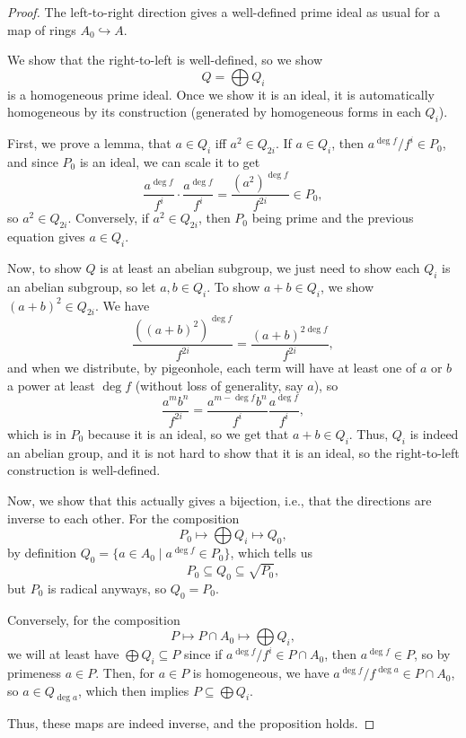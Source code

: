 \documentclass[12pt]{article}
\begin{document}
\begin{proof}
    The left-to-right direction gives a well-defined prime ideal as usual for a map of rings $A_0 \hookrightarrow A$.

    We show that the right-to-left is well-defined, so we show
    \[Q = \bigoplus Q_i\]
    is a homogeneous prime ideal. Once we show it is an ideal, it is automatically homogeneous by its construction (generated by homogeneous forms in each $Q_i$).

    First, we prove a lemma, that $a\in Q_i$ iff $a^2\in Q_{2i}$. If $a\in Q_i$, then $a^{\deg f}/f^i \in P_0$, and since $P_0$ is an ideal, we can scale it to get
    \[\frac{a^{\deg f}}{f^i} \cdot \frac{a^{\deg f}}{f^i} = \frac{(a^2)^{\deg f}}{f^{2i}} \in P_0,\]
    so $a^2 \in Q_{2i}$. Conversely, if $a^2 \in Q_{2i}$, then $P_0$ being prime and the previous equation gives $a \in Q_i$.
    
    Now, to show $Q$ is at least an abelian subgroup, we just need to show each $Q_i$ is an abelian subgroup, so let $a,b\in Q_i$. To show $a+b\in Q_i$, we show $(a+b)^2 \in Q_{2i}$. We have
    \[\frac{((a+b)^2)^{\deg f}}{f^{2i}} = \frac{(a + b)^{2\deg f}}{f^{2i}},\]
    and when we distribute, by pigeonhole, each term will have at least one of $a$ or $b$ a power at least $\deg f$ (without loss of generality, say $a$), so
    \[\frac{a^m b^n}{f^{2i}} = \frac{a^{m-\deg f} b^n}{f^i} \frac{a^{\deg f}}{f^i},\]
    which is in $P_0$ because it is an ideal, so we get that $a+b\in Q_i$. Thus, $Q_i$ is indeed an abelian group, and it is not hard to show that it is an ideal, so the right-to-left construction is well-defined.

    Now, we show that this actually gives a bijection, i.e., that the directions are inverse to each other. For the composition
    \[P_0 \mapsto \bigoplus Q_i \mapsto Q_0,\]
    by definition $Q_0 = \{a\in A_0 \mid a^{\deg f} \in P_0\}$, which tells us
    \[P_0 \subseteq Q_0 \subseteq \sqrt{P_0},\]
    but $P_0$ is radical anyways, so $Q_0 = P_0$.

    Conversely, for the composition
    \[P \mapsto P\cap A_0 \mapsto \bigoplus Q_i,\]
    we will at least have $\bigoplus Q_i \subseteq P$ since if $a^{\deg f}/f^i \in P \cap A_0$, then $a^{\deg f} \in P$, so by primeness $a\in P$. Then, for $a\in P$ is homogeneous, we have $a^{\deg f}/f^{\deg a} \in P\cap A_0$, so $a\in Q_{\deg a}$, which then implies $P\subseteq \bigoplus Q_i$.

    Thus, these maps are indeed inverse, and the proposition holds.
\end{proof}
\end{document}
